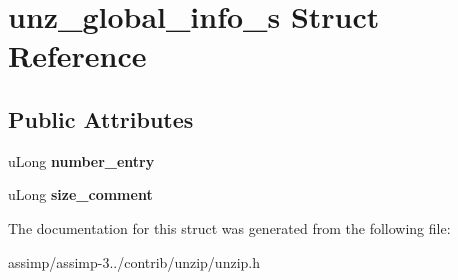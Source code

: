 \hypertarget{structunz__global__info__s}{\section{unz\+\_\+global\+\_\+info\+\_\+s Struct Reference}
\label{structunz__global__info__s}
}
\subsection*{Public Attributes}
\begin{DoxyCompactItemize}
\item 
\hypertarget{structunz__global__info__s_a827d1cd1d09f12acd6c2ee12494cb320}{u\+Long {\bfseries number\+\_\+entry}}\label{structunz__global__info__s_a827d1cd1d09f12acd6c2ee12494cb320}

\item 
\hypertarget{structunz__global__info__s_a10b58ab57b62301de813ecac0e974363}{u\+Long {\bfseries size\+\_\+comment}}\label{structunz__global__info__s_a10b58ab57b62301de813ecac0e974363}

\end{DoxyCompactItemize}


The documentation for this struct was generated from the following file\+:\begin{DoxyCompactItemize}
\item 
assimp/assimp-\/3../contrib/unzip/unzip.\+h\end{DoxyCompactItemize}

